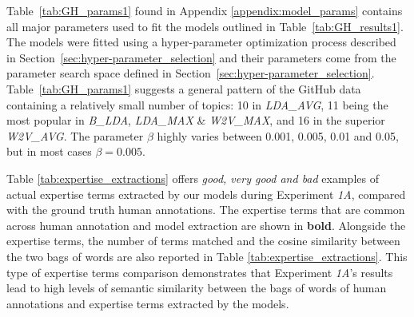             Table~\ref{tab:GH_params1} found in Appendix \ref{appendix:model_params} contains all major parameters used to fit the models outlined in Table~\ref{tab:GH_results1}. The models were fitted using a hyper-parameter optimization process described in Section~\ref{sec:hyper-parameter_selection} and their parameters come from the parameter search space defined in Section~\ref{sec:hyper-parameter_selection}. Table~\ref{tab:GH_params1} suggests a general pattern of the GitHub data containing a relatively small number of topics: 10 in \emph{LDA\_AVG}, 11 being the most popular in \emph{B\_LDA}, \emph{LDA\_MAX} \& \emph{W2V\_MAX}, and 16 in the superior \emph{W2V\_AVG}. The parameter $\beta$ highly varies between 0.001, 0.005, 0.01 and 0.05, but in most cases $\beta=0.005$.
            
            Table \ref{tab:expertise_extractions} offers \emph{good, very good and bad} examples of actual expertise terms extracted by our models during Experiment \emph{1A}, compared with the ground truth human annotations. The expertise terms that are common across human annotation and model extraction are shown in \textbf{bold}. Alongside the expertise terms, the number of terms matched and the cosine similarity between the two bags of words are also reported in Table \ref{tab:expertise_extractions}. This type of expertise terms comparison demonstrates that Experiment \emph{1A}'s results lead to high levels of semantic similarity between the bags of words of human annotations and expertise terms extracted by the models.
        

